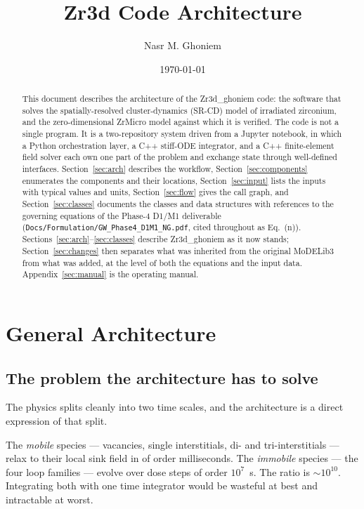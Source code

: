 \documentclass[11pt]{article}
\title{\textbf{Zr3d Code Architecture}}
\author{Nasr M. Ghoniem}
\date{\today}
\newcommand{\ZrM}{\textsf{ZrMicro}}
\newcommand{\MoD}{\textsf{MoDELib3}}
\newcommand{\Zrd}{\textsf{Zr3d\_ghoniem}}
\newcommand{\file}[1]{\texttt{\footnotesize #1}}
\newcommand{\dref}[1]{Eq.~(#1)}
\begin{document}
\maketitle

\begin{abstract}
\noindent
This document describes the architecture of the \Zrd{} code: the software that
solves the spatially-resolved cluster-dynamics (SR-CD) model of irradiated
zirconium, and the zero-dimensional \ZrM{} model against which it is verified.
The code is not a single program. It is a two-repository system driven from a
Jupyter notebook, in which a Python orchestration layer, a C++ stiff-ODE
integrator, and a C++ finite-element field solver each own one part of the
problem and exchange state through well-defined interfaces. Section~\ref{sec:arch}
describes the workflow, Section~\ref{sec:components} enumerates the components and
their locations, Section~\ref{sec:input} lists the inputs with typical values and
units, Section~\ref{sec:flow} gives the call graph, and Section~\ref{sec:classes}
documents the classes and data structures with references to the governing
equations of the Phase-4 D1/M1 deliverable
(\file{Docs/Formulation/GW\_Phase4\_D1M1\_NG.pdf}, cited throughout as
\dref{n}). Sections~\ref{sec:arch}--\ref{sec:classes} describe \Zrd{} as it now
stands; Section~\ref{sec:changes} then separates what was inherited from the
original \MoD{} from what was added, at the level of both the equations and the
input data. Appendix~\ref{sec:manual} is the operating manual.
\end{abstract}

\tableofcontents

\section{General Architecture}
\label{sec:arch}

\subsection{The problem the architecture has to solve}

The physics splits cleanly into two time scales, and the architecture is a direct
expression of that split.

The \emph{mobile} species --- vacancies, single interstitials, di- and
tri-interstitials --- relax to their local sink field in of order milliseconds.
The \emph{immobile} species --- the four loop families --- evolve over dose
steps of order $10^{7}$~s. The ratio is $\sim 10^{10}$. Integrating both with one
time integrator would be wasteful at best and intractable at worst.
\end{document}
